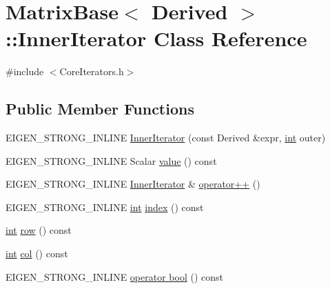 \hypertarget{class_matrix_base_1_1_inner_iterator}{\section{Matrix\-Base$<$ Derived $>$\-:\-:Inner\-Iterator Class Reference}
\label{class_matrix_base_1_1_inner_iterator}
}


{\ttfamily \#include $<$Core\-Iterators.\-h$>$}

\subsection*{Public Member Functions}
\begin{DoxyCompactItemize}
\item 
E\-I\-G\-E\-N\-\_\-\-S\-T\-R\-O\-N\-G\-\_\-\-I\-N\-L\-I\-N\-E \hyperlink{class_matrix_base_1_1_inner_iterator_a212ec14ef7c6b610bd5ef8ae0c89ae48}{Inner\-Iterator} (const Derived \&expr, \hyperlink{ioapi_8h_a787fa3cf048117ba7123753c1e74fcd6}{int} outer)
\item 
E\-I\-G\-E\-N\-\_\-\-S\-T\-R\-O\-N\-G\-\_\-\-I\-N\-L\-I\-N\-E Scalar \hyperlink{class_matrix_base_1_1_inner_iterator_a64098dfb824c21563d78b856f57a8bf7}{value} () const 
\item 
E\-I\-G\-E\-N\-\_\-\-S\-T\-R\-O\-N\-G\-\_\-\-I\-N\-L\-I\-N\-E \hyperlink{class_matrix_base_1_1_inner_iterator}{Inner\-Iterator} \& \hyperlink{class_matrix_base_1_1_inner_iterator_a1dfebfed49204be36d240afca5869217}{operator++} ()
\item 
E\-I\-G\-E\-N\-\_\-\-S\-T\-R\-O\-N\-G\-\_\-\-I\-N\-L\-I\-N\-E \hyperlink{ioapi_8h_a787fa3cf048117ba7123753c1e74fcd6}{int} \hyperlink{class_matrix_base_1_1_inner_iterator_a4b78d7866082ec8ef0bf677b1ba84e92}{index} () const 
\item 
\hyperlink{ioapi_8h_a787fa3cf048117ba7123753c1e74fcd6}{int} \hyperlink{class_matrix_base_1_1_inner_iterator_a79891fe2cb979a53c12b12a723383f93}{row} () const 
\item 
\hyperlink{ioapi_8h_a787fa3cf048117ba7123753c1e74fcd6}{int} \hyperlink{class_matrix_base_1_1_inner_iterator_a68bb724c0fb997a4a3e965c3f1e94869}{col} () const 
\item 
E\-I\-G\-E\-N\-\_\-\-S\-T\-R\-O\-N\-G\-\_\-\-I\-N\-L\-I\-N\-E \hyperlink{class_matrix_base_1_1_inner_iterator_a9af4d38c0789396a05146a0f7999e61e}{operator bool} () const 
\end{DoxyCompactItemize}
